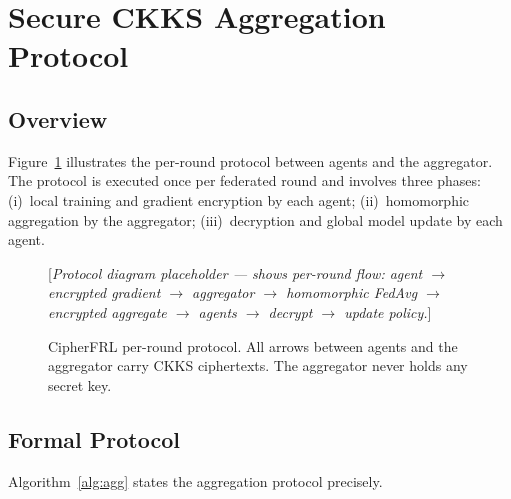 \documentclass[letterpaper,journal]{IEEEtran}
\begin{document}
\section{Secure CKKS Aggregation Protocol}\label{sec:protocol}

\subsection{Overview}

Figure~\ref{fig:protocol} illustrates the per-round protocol between agents
and the aggregator.
The protocol is executed once per federated round and involves three phases:
(i)~local training and gradient encryption by each agent;
(ii)~homomorphic aggregation by the aggregator;
(iii)~decryption and global model update by each agent.

\begin{figure}[t]
  \centering
  [\textit{Protocol diagram placeholder — shows per-round flow:
  agent $\to$ encrypted gradient $\to$ aggregator $\to$ homomorphic FedAvg
  $\to$ encrypted aggregate $\to$ agents $\to$ decrypt $\to$ update policy.}]
  \caption{CipherFRL per-round protocol.
           All arrows between agents and the aggregator carry CKKS ciphertexts.
           The aggregator never holds any secret key.}
  \label{fig:protocol}
\end{figure}

\subsection{Formal Protocol}

Algorithm~\ref{alg:agg} states the aggregation protocol precisely.
\end{document}
